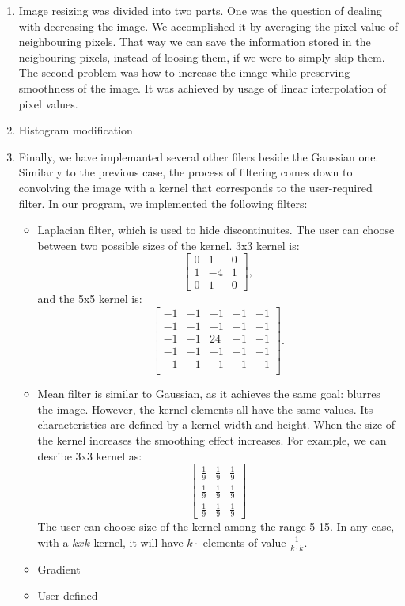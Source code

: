 \documentclass[a4paper,12pt]{article}
\begin{document}
\begin{enumerate}

\item Image resizing was divided into two parts. One was the question of dealing with decreasing the image. We accomplished it by averaging the pixel value of neighbouring pixels. That way we can save the information stored in the neigbouring pixels, instead of loosing them, if we were to simply skip them. The second problem was how to increase the image while preserving smoothness of the image. It was achieved by usage of linear interpolation of pixel values. 

\item Histogram modification

\item Finally, we have implemanted several other filers beside the Gaussian one. Similarly to the previous case, the process of filtering comes down to convolving the image with a kernel that corresponds to the user-required filter. In our program, we implemented the following filters:
\begin{itemize}
    \item Laplacian filter, which is used to hide discontinuites. The user can choose between two possible sizes of the kernel. 3x3 kernel is:
$$\left[\begin{array}{ccc} 0 & 1 & 0\\
1 &-4 & 1\\ 0 & 1 & 0 
\end{array}\right],$$
and the 5x5 kernel is:
$$\left[\begin{array}{ccccc} -1 & -1 & -1 & -1 & -1\\
-1 & -1 & -1 & -1 & -1\\
-1 & -1 & 24 & -1 & -1\\
-1 & -1 & -1 & -1 & -1\\
-1 & -1 & -1 & -1 & -1\\
\end{array}\right].$$
	 \item Mean filter is similar to Gaussian, as it achieves the same goal: blurres the image. However, the kernel elements all have the same values. Its characteristics are defined by a kernel width and height. When the size of the kernel increases the smoothing effect increases. For example, we can desribe 3x3 kernel as:
$$\left[\begin{array}{ccc} \frac{1}{9} & \frac{1}{9} & \frac{1}{9}\\
\frac{1}{9} & \frac{1}{9} & \frac{1}{9}\\ \frac{1}{9} & \frac{1}{9} & \frac{1}{9} 
\end{array}\right]$$
The user can choose size of the kernel among the range 5-15. In any case, with a $kxk$ kernel, it will have $k\cdot$ elements of value $\frac{1}{k\cdot k}$.
	 \item Gradient
	 \item User defined

\end{itemize}

\end{enumerate}
\end{document}
